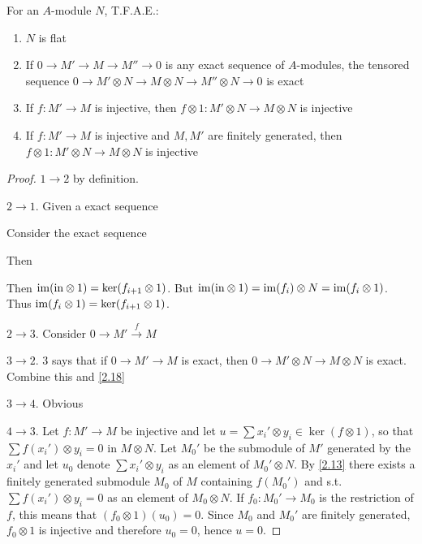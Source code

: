 \documentclass[11pt]{article}
\begin{document}
\begin{proposition}[]
For an \(A\)-module \(N\), T.F.A.E.:
\begin{enumerate}
\item \(N\) is flat
\item If \(0\to M'\to M\to M''\to 0\) is any exact sequence of \(A\)-modules, the tensored
sequence \(0\to M'\otimes N\to M\otimes N\to M''\otimes N\to 0\) is exact
\item If \(f:M'\to M\) is injective, then \(f\otimes 1:M'\otimes N\to M\otimes N\) is injective
\item If \(f:M'\to M\) is injective and \(M,M'\) are finitely generated, then \(f\otimes 1:M'\otimes N\to M\otimes N\) is injective
\end{enumerate}
\end{proposition}

\begin{proof}
\(1\to 2\) by definition.

\(2\to 1\). Given a exact sequence
\begin{center}\end{center}
Consider the exact sequence
\begin{center}\end{center}
Then
\begin{center}\end{center}
Then \(\operatorname{im}(\text{in}\otimes 1)=\ker(f_{i+1}\otimes 1)\). But \(\operatorname{im}(\text{in}\otimes 1)=\operatorname{im}(f_i)\otimes N=\operatorname{im}(f_i\otimes 1)\).
Thus \(\operatorname{im}(f_i\otimes 1)=\ker(f_{i+1}\otimes 1)\).

\(2\to 3\). Consider \(0\to M'\xrightarrow{f}M\)

\(3\to 2\). 3 says that if \(0\to M'\to M\) is exact, then \(0\to M'\otimes N\to M\otimes N\) is exact. Combine this
and \ref{2.18}

\(3\to 4\). Obvious

\(4\to 3\). Let \(f:M'\to M\) be injective and let \(u=\sum x_i'\otimes y_i\in\ker(f\otimes 1)\), so
that \(\sum f(x_i')\otimes y_i=0\) in \(M\otimes N\). Let \(M_0'\) be the submodule of \(M'\) generated by
the \(x_i'\) and let \(u_0\) denote \(\sum x_i'\otimes y_i\) as an element of \(M_0'\otimes N\). By \ref{2.13} there
exists a finitely generated submodule \(M_0\) of \(M\) containing \(f(M_0')\) and
s.t. \(\sum f(x_i')\otimes y_i=0\) as an element of \(M_0\otimes N\). If \(f_0:M_0'\to M_0\) is the restriction
of \(f\), this means that \((f_0\otimes 1)(u_0)=0\). Since \(M_0\) and \(M_0'\) are finitely
generated, \(f_0\otimes 1\) is injective and therefore \(u_0=0\), hence \(u=0\).
\end{proof}
\end{document}
